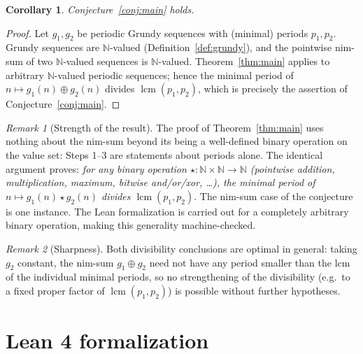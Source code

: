 \documentclass[11pt]{article}
\newtheorem{corollary}[theorem]{Corollary}
\theoremstyle{definition}
\theoremstyle{remark}
\newtheorem*{remark}{Remark}
\begin{document}
\begin{corollary}\label{cor:conj}
Conjecture~\ref{conj:main} holds.
\end{corollary}

\begin{proof}
Let $g_1, g_2$ be periodic Grundy sequences with (minimal) periods $p_1, p_2$. Grundy sequences are $\mathbb{N}$-valued (Definition~\ref{def:grundy}), and the pointwise nim-sum of two $\mathbb{N}$-valued sequences is $\mathbb{N}$-valued. Theorem~\ref{thm:main} applies to arbitrary $\mathbb{N}$-valued periodic sequences; hence the minimal period of $n \mapsto g_1(n) \oplus g_2(n)$ divides $\operatorname{lcm}(p_1, p_2)$, which is precisely the assertion of Conjecture~\ref{conj:main}.
\end{proof}

\begin{remark}[Strength of the result]
The proof of Theorem~\ref{thm:main} uses nothing about the nim-sum beyond its being a well-defined binary operation on the value set: Steps 1--3 are statements about periods alone. The identical argument proves: \emph{for any binary operation $\star \colon \mathbb{N} \times \mathbb{N} \to \mathbb{N}$ (pointwise addition, multiplication, maximum, bitwise and/or/xor, \dots), the minimal period of $n \mapsto g_1(n) \star g_2(n)$ divides $\operatorname{lcm}(p_1, p_2)$}. The nim-sum case of the conjecture is one instance. The Lean formalization is carried out for a completely arbitrary binary operation, making this generality machine-checked.
\end{remark}

\begin{remark}[Sharpness]
Both divisibility conclusions are optimal in general: taking $g_2$ constant, the nim-sum $g_1 \oplus g_2$ need not have any period smaller than the lcm of the individual minimal periods, so no strengthening of the divisibility (e.g.\ to a fixed proper factor of $\operatorname{lcm}(p_1,p_2)$) is possible without further hypotheses.
\end{remark}

\section{Lean 4 formalization}
\end{document}
